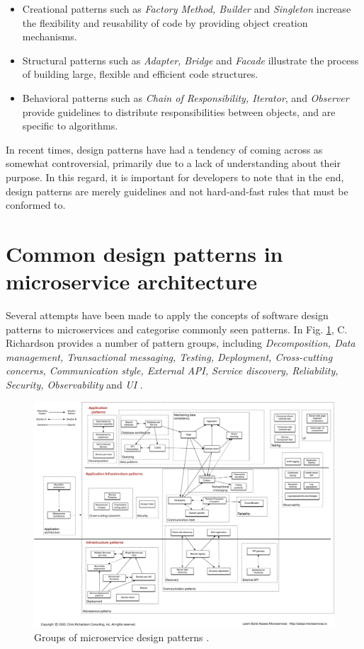 \begin{itemize}
	\item Creational patterns such as \textit{Factory Method, Builder} and \textit{Singleton} increase the flexibility and reusability of code by providing object creation mechanisms.
	\item Structural patterns such as \textit{Adapter, Bridge} and \textit{Facade} illustrate the process of building large, flexible and efficient code structures.
	\item Behavioral patterns such as \textit{Chain of Responsibility, Iterator}, and \textit{Observer} provide guidelines to distribute responsibilities between objects, and are specific to algorithms.
\end{itemize}

In recent times, design patterns have had a tendency of coming across as somewhat controversial, primarily due to a lack of understanding about their purpose. In this regard, it is important for developers to note that in the end, design patterns are merely guidelines and not hard-and-fast rules that must be conformed to.

\section{Common design patterns in microservice architecture}

Several attempts have been made to  apply the concepts of software design patterns to microservices and categorise commonly seen patterns. In Fig. \ref{fig:richardson-patterns}, C. Richardson provides a number of pattern groups, including \textit{Decomposition, Data management, Transactional messaging, Testing, Deployment, Cross-cutting concerns, Communication style, External API, Service discovery, Reliability, Security, Observability} and \textit{UI} \cite{richardson-patterns}.

\begin{figure}[h]
	\centering
	\includegraphics[width=1.0\linewidth]{./assets/images/related-work/richardson-patterns.pdf}
	\caption{Groups of microservice design patterns \cite{richardson-patterns}.}
	\label{fig:richardson-patterns}
\end{figure}

